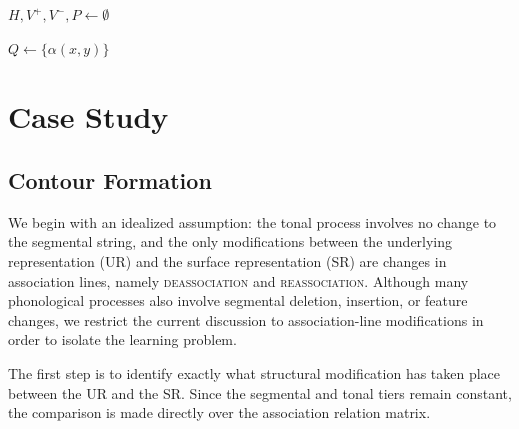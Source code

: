 \documentclass[pmlr]{jmlr}%
\begin{document}
\begin{algorithm}[th!]
\small
{}

$H,V^+,V^-,P \gets \emptyset$\;

$Q \gets \{\alpha(x,y)\}$\;



\;

\end{algorithm}

\section{Case Study}
\subsection{Contour Formation}
We begin with an idealized assumption: the tonal process involves no
change to the segmental string, and the only modifications between the
underlying representation (UR) and the surface representation (SR) are
changes in association lines, namely \textsc{deassociation} and
\textsc{reassociation}. Although many phonological processes also
involve segmental deletion, insertion, or feature changes, we restrict
the current discussion to association-line modifications in order to
isolate the learning problem.

The first step is to identify exactly what structural modification has
taken place between the UR and the SR. Since the segmental and tonal
tiers remain constant, the comparison is made directly over the
association relation matrix.
\end{document}
